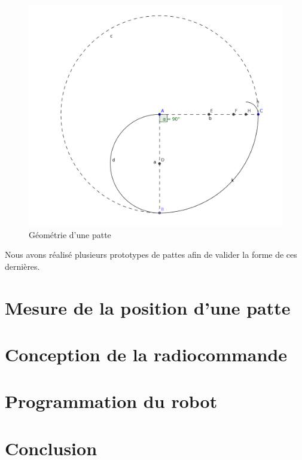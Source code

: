 \documentclass[12pt,french,a4paper]{article}
\begin{document}
\begin{figure}[h!]
	\centering
	\includegraphics[width=\textwidth/2]{images/patteSchema.png}
	\caption[Moule_1]{\label{fig:geometrie_patte} Géométrie d'une patte}
\end{figure}

Nous avons réalisé plusieurs prototypes de pattes afin de valider la forme de ces dernières. 

\part{Mesure de la position d'une patte}

\part{Conception de la radiocommande}

\part{Programmation du robot}

\part{Conclusion}
\end{document}
